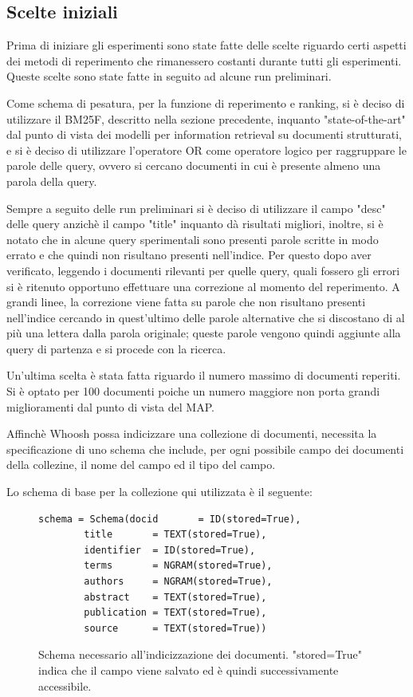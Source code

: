 \documentclass[runningheads]{llncs}
\begin{document}
\subsection{Scelte iniziali}

Prima di iniziare gli esperimenti sono state fatte delle scelte riguardo certi aspetti dei metodi di reperimento che rimanessero costanti durante tutti gli esperimenti.
Queste scelte sono state fatte in seguito ad alcune run preliminari.

Come schema di pesatura, per la funzione di reperimento e ranking,  si \`e deciso di utilizzare il BM25F, descritto nella sezione precedente, inquanto "state-of-the-art" dal punto di vista dei modelli per information retrieval su documenti strutturati, e si \`e deciso di utilizzare l'operatore OR come operatore logico per raggruppare le parole delle query, ovvero si cercano documenti in cui \`e presente almeno una parola della query.

Sempre a seguito delle run preliminari si \`e deciso di utilizzare il campo "desc" delle query anzich\`e il campo "title" inquanto d\`a risultati migliori, inoltre, si \`e notato che in alcune query sperimentali sono presenti parole scritte in modo errato e che quindi non risultano presenti nell'indice.
Per questo dopo aver verificato, leggendo i documenti rilevanti per quelle query, quali fossero gli errori si \`e ritenuto opportuno effettuare una correzione al momento del reperimento.
A grandi linee, la correzione viene fatta su parole che non risultano presenti nell'indice cercando in quest'ultimo delle parole alternative che si discostano di al pi\`u una lettera dalla parola originale; queste parole vengono quindi aggiunte alla query di partenza e si procede con la ricerca.

Un'ultima scelta \`e stata fatta riguardo il numero massimo di documenti reperiti.
Si \`e optato per 100 documenti poiche un numero maggiore non porta grandi miglioramenti dal punto di vista del MAP. \par

Affinch\`e Whoosh possa indicizzare una collezione di documenti, necessita la
specificazione di uno schema che include, per ogni possibile campo dei documenti della collezine, il nome del campo ed il tipo del campo.

Lo schema di base per la collezione qui utilizzata \`e il seguente:
\par

\begin{figure}
\begin{lstlisting}
schema = Schema(docid      	= ID(stored=True),
		title      	= TEXT(stored=True),
		identifier	= ID(stored=True),
		terms 		= NGRAM(stored=True),
		authors		= NGRAM(stored=True),
		abstract 	= TEXT(stored=True),
		publication	= TEXT(stored=True),
		source 		= TEXT(stored=True))
\end{lstlisting}
      \caption{Schema necessario all'indicizzazione dei documenti. "stored=True" indica che il campo viene salvato ed \`e quindi successivamente accessibile. }
\end{figure}
\end{document}
